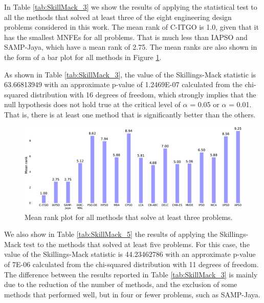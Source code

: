 In Table \ref{tab:SkillMack_3} we show the results of applying the statistical test to all the methods that solved at least three of the eight engineering design problems considered in this work. The mean rank of C-ITGO is 1.0, given that it has the smallest MNFEs for all problems. That is much less than IAPSO and SAMP-Jaya, which have a mean rank of 2.75. The mean ranks are also shown in the form of a bar plot for all methods in Figure \ref{fig:SkillMack_3}.





As shown in Table \ref{tab:SkillMack_3}, the value of the Skillings-Mack statistic is 63.66813949 with an approximate p-value of 1.2469E-07 calculated from the chi-squared distribution with 16 degrees of freedom, which strongly implies that the null hypothesis does not hold true at the critical level of $\alpha$ = 0.05 or $\alpha$ = 0.01. That is, there is at least one method that is significantly better than the others. 



\begin{figure}[h]
    \begin{center}
    \includegraphics[scale=0.6]{Imgs/SkillMack_3-crop.pdf}
    \end{center}
    \captionsetup{justification=centering}
    \vspace*{-4mm}
    \caption{Mean rank plot for all methods that solve at least three problems.}\label{fig:SkillMack_3}
\end{figure}



We also show in Table \ref{tab:SkillMack_5} the results of applying the Skillings-Mack test to the methods that solved at least five problems. For this case, the value of the Skillings-Mack statistic is 44.23462786 with an approximate p-value of 7E-06 calculated from the chi-squared distribution with 11 degrees of freedom. The difference between the results reported in Table \ref{tab:SkillMack_3} is mainly due to the reduction of the number of methods, and the exclusion of some methods that performed well, but in four or fewer problems, such as SAMP-Jaya.


